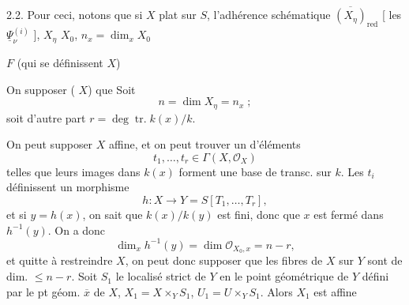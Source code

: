 \documentclass[11pt,a4paper]{article}
\begin{document}
2.2. Pour ceci, notons que \struck{\ill{}} si $X$  plat sur  $S$, l'adhérence schématique $\overline{(X_\eta)}_{\mathrm{red}}$ [ \struck{\ill{}} les $\underline{\Psi}^{(i)}_\nu$ \add{\uncertain{\ill{}}}  \ill{}], \ill{}  $X_\eta$ \ill{} \ill{} \ill{} $X_0$, \struck{\ill{}} \ill{} \ill{}  $n_x = \dim_x X_0$ 

$F$ (qui se définissent \ill{} \ill{} \ill{} \ill{} $X$) \ill{}

On  supposer  (  $X$) que  Soit
\[
n = \dim X_\eta = n_x \; ;
\]
 soit d'autre part $r = \deg \operatorname{tr.} k(x)/k$.


On peut supposer $X$ affine, et on peut trouver un  d'éléments
\[
t_1, \ldots, t_r \in \Gamma(X, \mathcal{O}_X)
\]
telles que leurs images dans $k(x)$ forment une base de transc. sur $k$. Les $t_i$ définissent un morphisme
\[
h : X \longrightarrow Y = S[T_1, \ldots, T_r] ,
\]
et si $y = h(x)$, on sait que $k(x)/k(y)$ est fini, donc que $x$ est fermé dans $h^{-1}(y)$. On a donc
\[
\dim_x h^{-1}(y) = \dim \mathcal{O}_{X_0, x} = n - r ,
\]
et quitte à restreindre $X$, on peut donc supposer que les fibres de $X$ sur $Y$ sont de dim. $\leqslant n - r$. Soit $S_1$ le \struck{\ill{}} localisé strict de $Y$ en le point géométrique de $Y$ défini par le pt géom. $\overline{x}$ de $X$, $X_1 = X \times_Y S_1$, $U_1 = U \times_Y S_1$. Alors $X_1$ est affine

\end{document}
